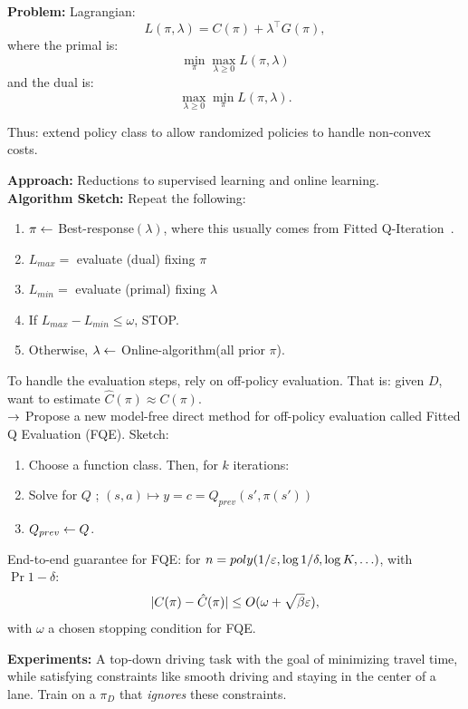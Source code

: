 {\bf Problem:} Lagrangian:
\[
L(\pi, \lambda) = C(\pi) + \lambda^\top G(\pi),
\]
where the primal is: 
\[
\min_\pi \max_{\lambda \geq 0} L(\pi, \lambda)
\]
and the dual is:
\[
\max_{\lambda \geq 0} \min_\pi L(\pi, \lambda).
\]

Thus: extend policy class to allow randomized policies to handle non-convex costs.

{\bf Approach:} Reductions to supervised learning and online learning. \\


{\bf Algorithm Sketch:} Repeat the following:
\begin{enumerate}
    \item $\pi \leftarrow$ Best-response$(\lambda)$, where this usually comes from Fitted Q-Iteration~\cite{ernst2005tree}.
    \item $L_{max} = $ evaluate (dual) fixing $\pi$
    \item $L_{min} = $ evaluate (primal) fixing $\lambda$
    \item If $L_{max} - L_{min} \leq \omega$, STOP.
    \item Otherwise, $\lambda \leftarrow$ Online-algorithm(all prior $\pi$).
\end{enumerate}

To handle the evaluation steps, rely on off-policy evaluation. That is: given $D$, want to estimate $\hat{C}(\pi) \approx C(\pi)$. \\

$\rightarrow$ Propose a new model-free direct method for off-policy evaluation called Fitted Q Evaluation (FQE). Sketch:
\begin{enumerate}
    \item Choose a function class. Then, for $k$ iterations:
    \item Solve for $Q$ ; $(s,a) \mapsto y = c = Q_{prev}(s', \pi(s'))$
    \item $Q_{prev} \leftarrow Q$.
\end{enumerate}

\begin{theorem}
End-to-end guarantee for FQE: for $n = poly(1/\varepsilon, \log 1/\delta, \log K, \ldots)$, with $\Pr 1-\delta$:
\[
|C(\pi) - \hat{C}(\pi)| \leq O(\omega +\sqrt{\beta}\varepsilon),
\]
with $\omega$ a chosen stopping condition for FQE.
\end{theorem}

{\bf Experiments:} A top-down driving task with the goal of minimizing travel time, while satisfying constraints like smooth driving and staying in the center of a lane. Train on a $\pi_D$ that {\it ignores} these constraints. \\

